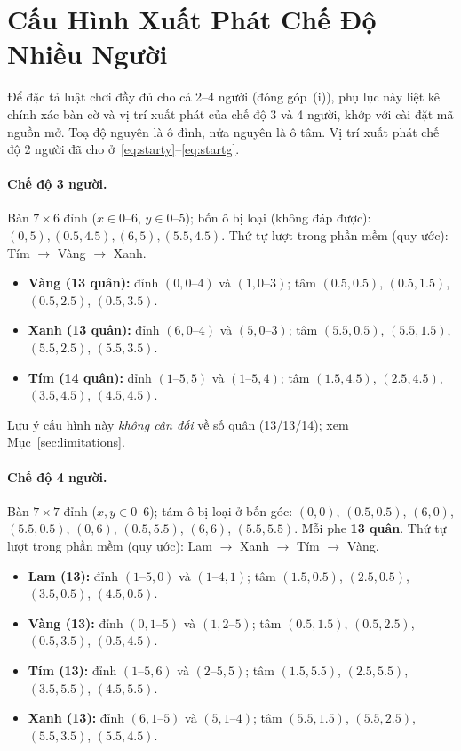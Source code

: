 \section{Cấu Hình Xuất Phát Chế Độ Nhiều Người}
\label{app:multistart}

Để đặc tả luật chơi đầy đủ cho cả 2--4 người (đóng góp~(i)), phụ lục này
liệt kê chính xác bàn cờ và vị trí xuất phát của chế độ 3 và 4 người, khớp
với cài đặt mã nguồn mở. Toạ độ nguyên là ô đỉnh, nửa nguyên là ô tâm. Vị
trí xuất phát chế độ 2 người đã cho ở~\eqref{eq:starty}--\eqref{eq:startg}.

\paragraph{Chế độ 3 người.} Bàn $7\times6$ đỉnh ($x\in0\text{--}6$,
$y\in0\text{--}5$); bốn ô bị loại (không đáp được):
$(0,5),(0.5,4.5),(6,5),(5.5,4.5)$. Thứ tự lượt trong phần mềm (quy ước):
Tím $\to$ Vàng $\to$ Xanh.
\begin{itemize}[noitemsep,topsep=2pt]
  \item \textbf{Vàng (13 quân):} đỉnh $(0,0\text{--}4)$ và $(1,0\text{--}3)$;
        tâm $(0.5,0.5)$, $(0.5,1.5)$, $(0.5,2.5)$, $(0.5,3.5)$.
  \item \textbf{Xanh (13 quân):} đỉnh $(6,0\text{--}4)$ và $(5,0\text{--}3)$;
        tâm $(5.5,0.5)$, $(5.5,1.5)$, $(5.5,2.5)$, $(5.5,3.5)$.
  \item \textbf{Tím (14 quân):} đỉnh $(1\text{--}5,5)$ và $(1\text{--}5,4)$;
        tâm $(1.5,4.5)$, $(2.5,4.5)$, $(3.5,4.5)$, $(4.5,4.5)$.
\end{itemize}
Lưu ý cấu hình này \emph{không cân đối} về số quân (13/13/14); xem
Mục~\ref{sec:limitations}.

\paragraph{Chế độ 4 người.} Bàn $7\times7$ đỉnh ($x,y\in0\text{--}6$); tám ô
bị loại ở bốn góc: $(0,0)$, $(0.5,0.5)$, $(6,0)$, $(5.5,0.5)$, $(0,6)$,
$(0.5,5.5)$, $(6,6)$, $(5.5,5.5)$. Mỗi phe \textbf{13 quân}. Thứ tự lượt trong phần mềm
(quy ước): Lam $\to$ Xanh $\to$ Tím $\to$ Vàng.
\begin{itemize}[noitemsep,topsep=2pt]
  \item \textbf{Lam (13):} đỉnh $(1\text{--}5,0)$ và $(1\text{--}4,1)$;
        tâm $(1.5,0.5)$, $(2.5,0.5)$, $(3.5,0.5)$, $(4.5,0.5)$.
  \item \textbf{Vàng (13):} đỉnh $(0,1\text{--}5)$ và $(1,2\text{--}5)$;
        tâm $(0.5,1.5)$, $(0.5,2.5)$, $(0.5,3.5)$, $(0.5,4.5)$.
  \item \textbf{Tím (13):} đỉnh $(1\text{--}5,6)$ và $(2\text{--}5,5)$;
        tâm $(1.5,5.5)$, $(2.5,5.5)$, $(3.5,5.5)$, $(4.5,5.5)$.
  \item \textbf{Xanh (13):} đỉnh $(6,1\text{--}5)$ và $(5,1\text{--}4)$;
        tâm $(5.5,1.5)$, $(5.5,2.5)$, $(5.5,3.5)$, $(5.5,4.5)$.
\end{itemize}
